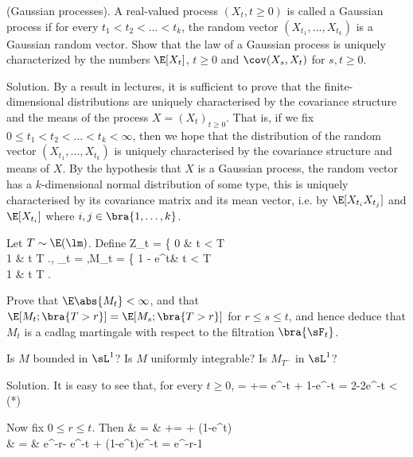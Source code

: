 \item (Gaussian processes). A real-valued process $(X_t, t \geq  0)$ is called a Gaussian process if for every $t_1 < t_2 < \dots < t_k$, the random vector $(X_{t_1} ,\dots ,X_{t_k})$ is a Gaussian random vector. Show that the law of a Gaussian process is uniquely characterized by the numbers $\E[X_t]$, $t \geq  0$ and $\cov(X_s,X_t)$ for $s, t \geq  0$.

\scutline

Solution. By a result in lectures, it is sufficient to prove that the finite-dimensional distributions are uniquely characterised by the covariance structure and the means of the process $X = (X_t)_{t\geq 0}$. That is, if we fix $0 \leq  t_1 < t_2 < \dots < t_k < \infty$, then we hope that the distribution of the random vector $(X_{t_1} , \dots ,X_{t_k})$ is uniquely characterised by the covariance structure and means of $X$. By the hypothesis that $X$ is a Gaussian process, the random vector has a $k$-dimensional normal distribution of some type, this is uniquely characterised by its covariance matrix and its mean vector, i.e. by $\E[X_{t_i}X_{t_j}]$ and $\E[X_{t_i}]$ where $i, j \in \bra{1, \dots ,k}$.

\vspace{2mm}

\qcutline


\item Let $T \sim \E(\lm )$. Define
\be
Z_t = \left\{
0 \qquad & t < T\\
1 & t \geq  T
\ea\right., \quad \sF_t = \sigma{},\quad  M_t = \left\{
1 - e^{\lm t}\qquad & t < T\\
1 & t \geq  T
\ea\right.
\ee

Prove that $\E\abs{M_t} < \infty$, and that $\E[M_t; \bra{T > r}] = \E[M_s; \bra{T > r}]$ for $r \leq s \leq t$, and hence deduce that $M_t$ is a cadlag martingale with respect to the filtration $\bra{\sF_t}$.

Is $M$ bounded in $\sL^1$? Is $M$ uniformly integrable? Is $M_{T^-}$ in $\sL^1$?

\scutline

Solution. It is easy to see that, for every $t \geq 0$,
\be
\E[\abs{M_t}] = + =  e^{-\lm t} + 1-e^{-\lm t} = 2-2e^{-\lm t} < \infty \qquad (*)
\ee

Now fix $0 \leq r \leq t$. Then
\beast
{} & = & + = \pro{} + (1-e^{\lm t})\pro{}\\
& = & e^{-\lm r}- e^{-\lm t} + (1-e^{\lm t})e^{-\lm t} = e^{-\lm r}-1
\eeast

